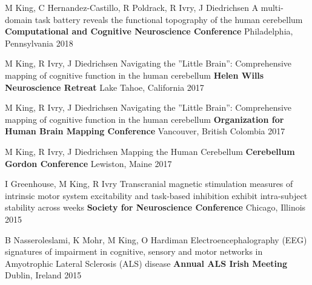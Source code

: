 \begin{cventries}
  \cventry
    {M King, C Hernandez-Castillo, R Poldrack, R Ivry, J Diedrichsen} %
    {A multi-domain task battery reveals the functional topography of the human cerebellum} %
    {\textbf{Computational and Cognitive Neuroscience Conference}} %
    {Philadelphia, Pennsylvania} %
    {2018} %
    
  \cventry
    {M King, R Ivry, J Diedrichsen} %
    {Navigating the ”Little Brain”: Comprehensive mapping of cognitive function in the human cerebellum} %
    {\textbf{Helen Wills Neuroscience Retreat}} %
    {Lake Tahoe, California} %
    {2017} %
    
  \cventry
    {M King, R Ivry, J Diedrichsen} %
    {Navigating the ”Little Brain”: Comprehensive mapping of cognitive function in the human cerebellum} %
    {\textbf{Organization for Human Brain Mapping Conference}} %
    {Vancouver, British Colombia} %
    {2017} %
    
  \cventry
    {M King, R Ivry, J Diedrichsen} %
    {Mapping the Human Cerebellum} %
    {\textbf{Cerebellum Gordon Conference}} %
    {Lewiston, Maine} %
    {2017} %
    
  \cventry
    {I Greenhouse, M King, R Ivry} %
    {Transcranial magnetic stimulation measures of intrinsic motor system excitability and task-based inhibition exhibit intra-subject stability across weeks} %
    {\textbf{Society for Neuroscience Conference}} %
    {Chicago, Illinois} %
    {2015} %
    
  \cventry
    {B Nasseroleslami, K Mohr, M King, O Hardiman} %
    {Electroencephalography (EEG) signatures of impairment in cognitive, sensory and motor networks in Amyotrophic Lateral Sclerosis (ALS) disease}%
    {\textbf{Annual ALS Irish Meeting}} %
    {Dublin, Ireland} %
    {2015} %

\end{cventries}
